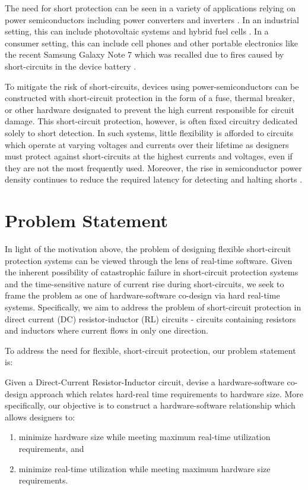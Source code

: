 \documentclass[11pt,oneside]{report}
\begin{document}
    The need for short protection can be seen in a variety of applications relying on power semiconductors including power converters and inverters \cite{hiSpeedProtection}.
    In an industrial setting, this can include photovoltaic systems and hybrid fuel cells \cite{photoVoltaic}. 
    In a consumer setting, this can include cell phones and other portable electronics like the recent Samsung Galaxy Note 7 which was recalled due to fires caused by short-circuits in the device battery \cite{explodingPhone}.
    
    To mitigate the risk of short-circuits, devices using power-semiconductors can be constructed with short-circuit protection in the form of a fuse, thermal breaker, or other hardware designated to prevent the high current responsible for circuit damage. 
    This short-circuit protection, however, is often fixed circuitry dedicated solely to short detection. In such systems, little flexibility is afforded to circuits which operate at varying voltages and currents over their lifetime as designers must protect against short-circuits at the highest currents and voltages, even if they are not the most frequently used. Moreover, the rise in semiconductor power density continues to reduce the required latency for detecting and halting shorts \cite{gateChargeChara}.
    
    \section*{Problem Statement}
    In light of the motivation above, the problem of designing flexible short-circuit protection systems can be viewed through the lens of real-time software.
    Given the inherent possibility of catastrophic failure in short-circuit protection systems and the time-sensitive nature of current rise during short-circuits, we seek to frame the problem as one of hardware-software co-design via hard real-time systems.
    Specifically, we aim to address the problem of short-circuit protection in direct current (DC) resistor-inductor (RL) circuits - circuits containing resistors and inductors where current flows in only one direction.
    
    To address the need for flexible, short-circuit protection, our problem statement is:
    
    \noindent Given a Direct-Current Resistor-Inductor circuit, devise a hardware-software co-design approach which relates hard-real time requirements to hardware size. More specifically, our objective is to construct a hardware-software relationship which allows designers to:
    \begin{enumerate}
        \item minimize hardware size while meeting maximum real-time utilization requirements, and
        \item minimize real-time utilization while meeting maximum hardware size requirements.
    \end{enumerate}
    
\end{document}
